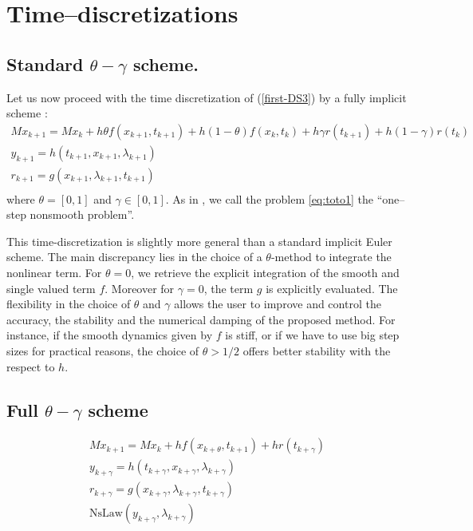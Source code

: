 \section{Time--discretizations}



\subsection{Standard $\theta-\gamma$ scheme.}
Let us now proceed with the time discretization of (\ref{first-DS3}) by a fully implicit scheme : 
\begin{equation}
  \begin{array}{l}
    \label{eq:toto1}
     M x_{k+1} = M x_{k} +h\theta f(x_{k+1},t_{k+1})+h(1-\theta) f(x_k,t_k) + h \gamma r(t_{k+1})
     + h(1-\gamma)r(t_k)  \\[2mm]
     y_{k+1} =  h(t_{k+1},x_{k+1},\lambda _{k+1}) \\[2mm]
     r_{k+1} = g(x_{k+1},\lambda_{k+1},t_{k+1})\\[2mm]
  \end{array}
\end{equation}
where $\theta = [0,1]$ and $\gamma \in [0,1]$. As in \cite{acary2008}, we call the problem \eqref{eq:toto1} the ``one--step nonsmooth problem''.



 This time-discretization is slightly more general than a standard implicit Euler scheme. The main discrepancy lies in the choice of a $\theta$-method to integrate the nonlinear term. For $\theta=0$, we retrieve the explicit integration of the smooth and  single valued term $f$. Moreover for $\gamma =0$, the term $g$ is explicitly evaluated. The flexibility in the choice of $\theta$ and $\gamma$ allows the user to improve and control the accuracy, the stability and the numerical damping of the proposed method. For instance, if the smooth dynamics given by $f$ is stiff, or if we have to use big step sizes for practical reasons, the choice of $\theta > 1/2$ offers better stability with the respect to $h$.

\subsection{Full $\theta-\gamma$ scheme}

  \begin{equation}
    \begin{array}{l}
      \label{eq:toto1-ter}
      M x_{k+1} = M x_{k} +h f(x_{k+\theta},t_{k+1}) + h r(t_{k+\gamma}) \\[2mm]
      y_{k+\gamma} =  h(t_{k+\gamma},x_{k+\gamma},\lambda _{k+\gamma}) \\[2mm]
      r_{k+\gamma} = g(x_{k+\gamma},\lambda_{k+\gamma},t_{k+\gamma})\\[2mm]
      \mbox{NsLaw} ( y_{k+\gamma} , \lambda_{k+\gamma})
    \end{array}
\end{equation}

